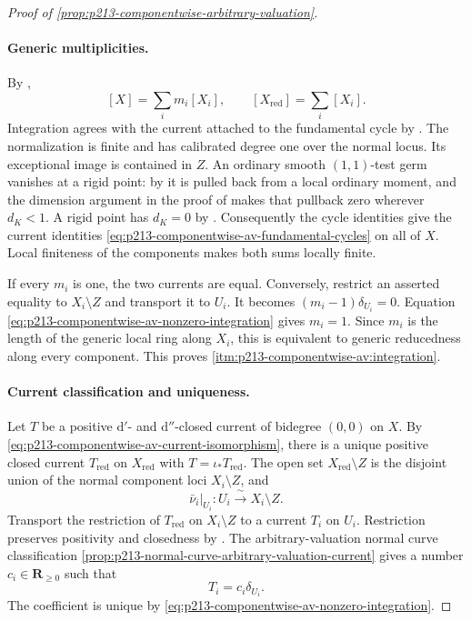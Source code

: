 \begin{proof}[Proof of
\cref{prop:p213-componentwise-arbitrary-valuation}]
\paragraph{Generic multiplicities.}
By \cite[Definition~13.2.5 and \S13.5.2]{CLD25},
\[
                   [X]=\sum_i m_i[X_i],
 \qquad
                   [X_{\mathrm{red}}]=\sum_i[X_i].
\]
Integration agrees with the current attached to the fundamental cycle by
\cite[Proposition~16.6.3]{CLD25}.  The normalization is finite and has
calibrated degree one over the normal locus.  Its exceptional image is
contained in $Z$.  An ordinary smooth $(1,1)$-test germ vanishes at a rigid
point: by \cite[Proposition~15.1.1(b)]{CLD25} it is pulled back from a
local ordinary moment, and the dimension argument in the proof of
\cite[Proposition~15.2.1(a)]{CLD25} makes that pullback zero wherever
$d_K<1$.  A rigid point has $d_K=0$ by \cite[(11.2.3.1)]{CLD25}.
Consequently the cycle identities give the current identities
\eqref{eq:p213-componentwise-av-fundamental-cycles} on all of $X$.
Local finiteness of the components makes both sums locally finite.

If every $m_i$ is one, the two currents are equal.  Conversely, restrict an
asserted equality to $X_i\setminus Z$ and transport it to $U_i$.  It becomes
$(m_i-1)\delta_{U_i}=0$.  Equation
\eqref{eq:p213-componentwise-av-nonzero-integration} gives $m_i=1$.
Since $m_i$ is the length of the generic local ring along $X_i$, this is
equivalent to generic reducedness along every component.  This proves
\cref{itm:p213-componentwise-av:integration}.

\paragraph{Current classification and uniqueness.}
Let $T$ be a positive $\mathrm d'$- and $\mathrm d''$-closed current of
bidegree $(0,0)$ on $X$.  By
\eqref{eq:p213-componentwise-av-current-isomorphism}, there is a unique
positive closed current $T_{\mathrm{red}}$ on $X_{\mathrm{red}}$ with
$T=\iota_*T_{\mathrm{red}}$.  The open set
$X_{\mathrm{red}}\setminus Z$ is the disjoint union of the normal component
loci $X_i\setminus Z$, and
\[
 \bar\nu_i|_{U_i}:U_i\xrightarrow{\ \sim\ }X_i\setminus Z.
\]
Transport the restriction of $T_{\mathrm{red}}$ on $X_i\setminus Z$ to a
current $T_i$ on $U_i$.  Restriction preserves positivity and closedness by
\cite[\S7.1.6 and \S\S7.7.1--7.7.3]{CLD25}.  The arbitrary-valuation normal
curve classification
\cref{prop:p213-normal-curve-arbitrary-valuation-current} gives a number
$c_i\in\mathbf R_{\geq0}$ such that
\begin{equation}
 \label{eq:p213-componentwise-av-classification-off-Z}
                            T_i=c_i\delta_{U_i}.
\end{equation}
The coefficient is unique by
\eqref{eq:p213-componentwise-av-nonzero-integration}.


\end{proof}
